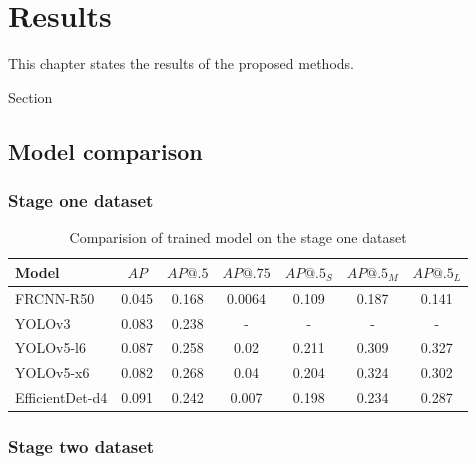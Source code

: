 \chapter{Results}
\label{chapter:results}
This chapter states the results of the proposed methods.


Section
\section{Model comparison}
\label{sec:model_comparison}
\subsection{Stage one dataset}
\begin{table}[h]
    \centering
    \begin{tabular}{|l|c|c|c|c|c|c|}
        \hline
        Model           & $AP$  & $AP@.5$ & $AP@.75$ & $AP@.5_S$ & $AP@.5_M$ & $AP@.5_L$ \\ \hline
        FRCNN-R50       & 0.045 & 0.168   & 0.0064   & 0.109     & 0.187     & 0.141     \\ \hline
        YOLOv3          & 0.083 & 0.238   & -        & -         & -         & -         \\ \hline
        YOLOv5-l6       & 0.087 & 0.258   & 0.02     & 0.211     & 0.309     & 0.327     \\ \hline
        YOLOv5-x6       & 0.082 & 0.268   & 0.04     & 0.204     & 0.324     & 0.302     \\ \hline
        EfficientDet-d4 & 0.091 & 0.242   & 0.007    & 0.198     & 0.234     & 0.287     \\ \hline
    \end{tabular}
    \caption{Comparision of trained model on the stage one dataset}
    \label{tab:model_results:stage_one}
\end{table}

\subsection{Stage two dataset}

